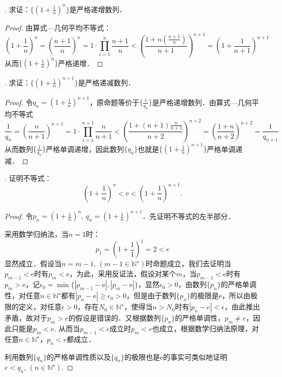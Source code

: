 \documentclass{ctexart}
\theoremstyle{definition}
\theoremstyle{definition}
\theoremstyle{plain}
\theoremstyle{plain}
\theoremstyle{plain}
\theoremstyle{definition}
\begin{document}
. 求证：$\displaystyle \{ (1+\frac{1}{n})^n \}$是严格递增数列．
\begin{proof}
由算式---几何平均不等式：
\begin{equation}
(1+\frac{1}{n})^n = (\frac{n+1}{n})^n = 1 \cdot \prod_{i=1}^{n} \frac{n+1}{n} < \left( \frac{1 + n(\frac{n+1}{n})}{n+1} \right)^{n+1} = \left( 1 + \frac{1}{n+1} \right)^{n+1}
\end{equation}
从而$\displaystyle \{ (1+\frac{1}{n})^n\}$严格递增．
\end{proof}
. 求证：$\displaystyle \{ (1+\frac{1}{n})^{n+1}\}$是严格递减数列．
\begin{proof}
令$\displaystyle q_n = (1 + \frac{1}{n})^{n+1}$，原命题等价于$\{ \displaystyle \frac{1}{q_n}\}$是严格递增数列．由算式---几何平均不等式
\begin{equation}
    \frac{1}{q_n} = \left( \frac{n}{n+1} \right)^{n+1} = 1 \cdot \prod_{i = 1}^{n+1} \frac{n}{n+1} < \left( \frac{1 + (n+1) \frac{n}{n+1}}{n+2} \right)^{n+2} = \left( \frac{1+n}{n+2}\right)^{n+2} = \frac{1}{q_{n+1}}
\end{equation}
从而数列$\{ \displaystyle \frac{1}{q_n} \}$严格单调递增，因此数列$\{ q_n \}$也就是$\{ \displaystyle (1 + \frac{1}{n})^{n+1}\}$严格单调递减．
\end{proof}
. 证明不等式：
\begin{equation}
    \left( 1+\frac{1}{n} \right)^n < \mathrm{e} < \left( 1 + \frac{1}{n} \right)^{n+1}.
\end{equation}
\begin{proof}
令$\displaystyle p_n = \left( 1+\frac{1}{n} \right)^n, \, q_n = \left( 1+\frac{1}{n} \right)^{n+1}$．先证明不等式的左半部分．

\noindent 采用数学归纳法，当$n=1$时：
\begin{equation}
    p_1 = (1+\frac{1}{1})^1 = 2 < e
\end{equation}
显然成立．假设当$n=m-1, \, (m-1 \in \mathbb{N}^\star)$时命题成立，我们去证明当$p_{m-1} < \mathrm{e}$时有$p_m < \mathrm{e}$，为此，采用反证法，假设对某个$m$，当$p_{m-1} < \mathrm{e}$时有$p_m > \mathrm{e}$，记$\epsilon_0 = \min \{ |p_{m-1} - \mathrm{e}|, |p_m - \mathrm{e}| \}$，显然$\epsilon_0 > 0$，由数列$\{ p_n \}$的严格单调性，对任意$n \in \mathbb{N}^\star$都有$|p_n - \mathrm{e}| \geq \epsilon_0 > 0$，但是由于数列$\{ p_n \}$的极限是$\mathrm{e}$，所以由极限的定义，对任意$\epsilon > 0$，存在$N_0 \in \mathbb{N}^\star$，使得当$n > N_0$时有$|p_n - e| < \epsilon$，由此推出矛盾，故对于$p_m > e$的假设是错误的．又根据数列$\{ p_n \}$的严格单调性，$p_m \neq e$，因此只能是$p_m < e$. 从而当$p_{m-1} < e$成立时$p_m < e$也成立，根据数学归纳法原理，对任意$n \in \mathbb{N}^\star$，$p_n < e$都成立．

\noindent 利用数列$\{ q_n \}$的严格单调性质以及$\{ q_n \}$的极限也是$\mathrm{e}$的事实可类似地证明$e < q_n, \, (n \in \mathbb{N}^\star)$.
\end{proof}
\end{document}
